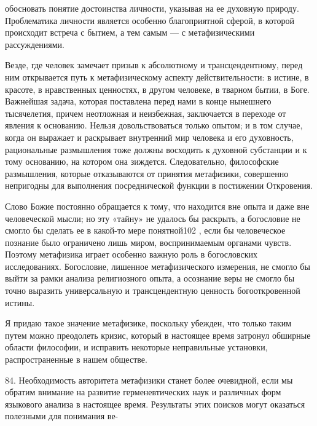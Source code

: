 \documentclass[a5paper,10pt]{article}
\begin{document}
обосновать понятие достоинства личности, указывая на ее духовную природу.
Проблематика личности является особенно благоприятной сферой, в которой
происходит встреча с бытием, а тем самым — с метафизическими рассуждениями.

Везде, где человек замечает призыв к абсолютному и трансцендентному, перед ним
открывается путь к метафизическому аспекту действительности: в истине, в
красоте, в нравственных ценностях, в другом человеке, в тварном бытии, в Боге.
Важнейшая задача, которая поставлена перед нами в конце нынешнего тысячелетия,
причем неотложная и неизбежная, заключается в переходе от явления к основанию.
Нельзя довольствоваться только опытом; и в том случае, когда он выражает и
раскрывает внутренний мир человека и его духовность, рациональные размышления
тоже должны восходить к духовной субстанции и к тому основанию, на котором она
зиждется. Следовательно, философские размышления, которые отказываются от
принятия метафизики, совершенно непригодны для выполнения посреднической
функции в постижении Откровения.

Слово Божие постоянно обращается к тому, что находится вне опыта и даже вне
человеческой мысли; но эту «тайну» не удалось бы раскрыть, а богословие не
смогло бы сделать ее в какой-то мере понятной102 , если бы человеческое
познание было ограничено лишь миром, воспринимаемым органами чувств. Поэтому
метафизика играет особенно важную роль в богословских исследованиях.
Богословие, лишенное метафизического измерения, не смогло бы выйти за рамки
анализа религиозного опыта, а осознание веры не смогло бы точно выразить
универсальную и трансцендентную ценность богооткровенной истины.

Я придаю такое значение метафизике, поскольку убежден, что только таким путем
можно преодолеть кризис, который в настоящее время затронул обширные области
философии, и исправить некоторые неправильные установки, распространенные в
нашем обществе.

84. Необходимость авторитета метафизики станет более очевидной, если мы обратим
внимание на развитие герменевтических наук и различных форм языкового анализа в
настоящее время. Результаты этих поисков могут оказаться полезными для
понимания ве-
\end{document}
